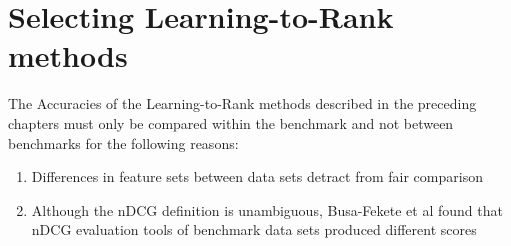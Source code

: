 \chapter{Selecting Learning-to-Rank methods}
The Accuracies of the Learning-to-Rank methods described in the preceding chapters must only be compared within the benchmark and not between benchmarks for the following reasons:
\begin{enumerate}
\item Differences in feature sets between data sets detract from fair comparison
\item Although the \ac{nDCG} definition is unambiguous, Busa-Fekete et al\cite{Busa-Fekete2012} found that \ac{nDCG} evaluation tools of benchmark data sets produced different scores
\end{enumerate}
